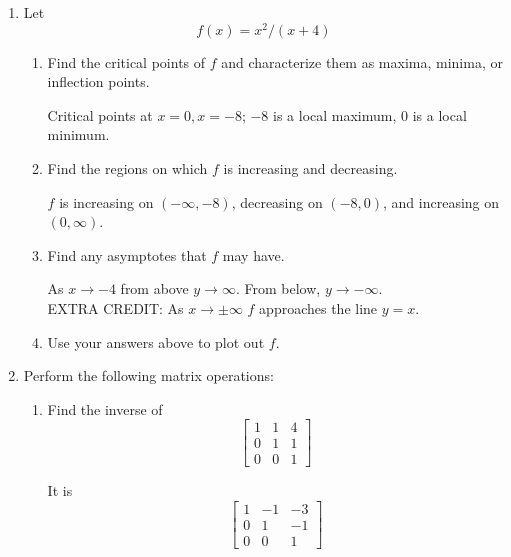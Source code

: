 \documentclass[11pt]{article}
\begin{document}
\begin{enumerate}
For any $\epsilon>0$, we can find a $\delta>0$ such that $|{1\over 2}x-10-{1\over 2}x_o+10|<\epsilon$ whenever $|x-x_o|<\delta$.  

Rearranging, we get ${1\over 2}|x-x_o|<\epsilon$ when $|x-x_o|<\delta$.  

Setting $\delta={2} \epsilon$ proves the result. $\Box$

\vspace{.2in}
\item Let $$f(x)=x^2/(x+4)$$
\begin{enumerate}
\item Find the critical points of $f$ and characterize them as maxima, minima, or inflection points.

Critical points at $x=0, x=-8$; $-8 $ is a local maximum, $0$ is a local minimum.
\item Find the regions on which $f$ is increasing and decreasing.

$f$ is increasing on $(-\infty, -8)$, decreasing on $(-8, 0)$, and increasing on $(0, \infty)$.


\item Find any asymptotes that $f$ may have.

 As $x\rightarrow -4$ from above $y\rightarrow \infty$.  From below, $y\rightarrow -\infty$.  \\EXTRA CREDIT:  As $x\rightarrow \pm\infty$ $f$ approaches the line $y=x$.
\item Use your answers above to plot out $f$.

\begin{center}
 
 \end{center}
 
\end{enumerate}

\newpage

\item Perform the following matrix operations:

\begin{enumerate}
\item Find the inverse of $$\begin{bmatrix}1 & 1& 4\\ 0& 1& 1\\0&0&1
\end{bmatrix}$$

 It is $$\begin{bmatrix}1 & -1& -3\\ 0& 1& -1\\0&0&1 \end{bmatrix}$$


\end{enumerate}
\end{enumerate}
\end{document}
